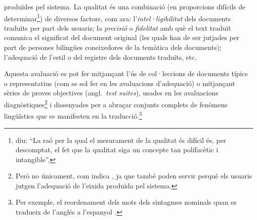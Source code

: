\begin{enumerate}
\begin{enumerate}
  produïdes pel sistema. La qualitat és una combinació
  (en proporcions difícils de determinar\footnote{\citet{minnis94j}
    diu: ``La raó per la qual el mesurament de la qualitat és
    difícil és, per descomptat, el fet que la qualitat siga
    un concepte tan polifacètic i intangible''.})
  de diversos factors, com ara: 
  l'\emph{intel·ligibilitat} 
  dels documents traduïts per part dels usuaris; 
  la \emph{precisió} o \emph{fidelitat} amb què el text
  traduït comunica el significat del document original (les quals
  han de ser jutjades per part
  de persones bilingües coneixedores de la temàtica dels
  documents); l'adequació de l'estil o del registre dels documents
  traduïts, etc. 

  Aquesta avaluació es pot fer mitjançant
  l'ús de col·leccions de documents típics o representatius 
  (com se sol
  fer en les avaluacions d'adequació) o mitjançant sèries de
  proves objectives (angl.\ \emph{test suites}),   
  usades en les avaluacions diagnòstiques\footnote{Però no
    únicament, com indica  \citet{lewis97j}, ja que també poden
    servir perquè els usuaris jutgen l'adequació de l'eixida
    produïda pel sistema.} i dissenyades per a
  abraçar conjunts complets de fenòmens lingüístics que 
  es manifesten en la traducció.\footnote{Per exemple, el reordenament
  dels mots dels sintagmes nominals quan es tradueix de l'anglés
  a l'espanyol \citep{mira98j,forcada00p}.}


\end{enumerate}
\end{enumerate}

